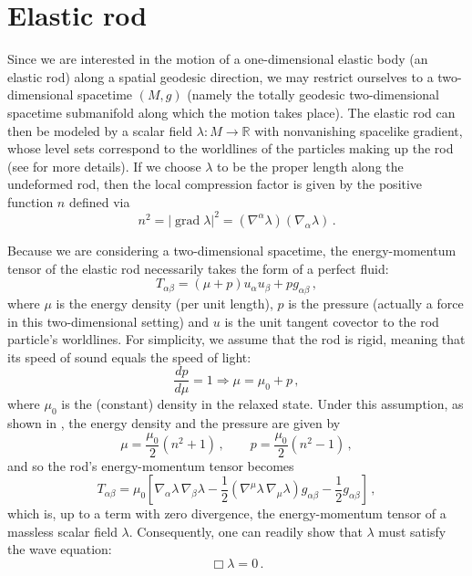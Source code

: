 \documentclass[10pt]{amsart}
\newcommand{\grad}{\operatorname{grad}}
\begin{document}
\section{Elastic rod}\label{section2}
%
Since we are interested in the motion of a one-dimensional elastic body (an elastic rod) along a spatial geodesic direction, we may restrict ourselves to a two-dimensional spacetime $(M,g)$ (namely the totally geodesic two-dimensional spacetime submanifold along which the motion takes place). The elastic rod can then be modeled by a scalar field $\lambda : M \to \mathbb{R}$ with nonvanishing spacelike gradient, whose level sets correspond to the worldlines of the particles making up the rod (see \cite{Natario14} for more details). If we choose $\lambda$ to be the proper length along the undeformed rod, then the local compression factor is given by the positive function $n$ defined via
%
\begin{equation}
n^2 = {|\grad \lambda|}^2 = ({\nabla}^{\alpha}\lambda)({\nabla}_{\alpha}\lambda) \, .
\end{equation}

Because we are considering a two-dimensional spacetime, the energy-momentum tensor of the elastic rod necessarily takes the form of a perfect fluid:
%
\begin{equation}
T_{\alpha\beta} = (\mu + p) u_\alpha u_\beta + p g_{\alpha\beta} \, ,
\end{equation}
%
where $\mu$ is the energy density (per unit length), $p$ is the pressure (actually a force in this two-dimensional setting) and $u$ is the unit tangent covector to the rod particle's worldlines.
%
For simplicity, we assume that the rod is rigid, meaning that its speed of sound equals the speed of light:
\begin{equation}
\frac{dp}{d\mu} = 1 \Rightarrow \mu = \mu_0 + p \, ,
\end{equation}
where $\mu_0$ is the (constant) density in the relaxed state. Under this assumption, as shown in \cite{Natario14}, the energy density and the pressure are given by
\begin{equation}
\mu = \frac{\mu_0}2 \left( n^2 + 1 \right) \, , \qquad p = \frac{\mu_0}2 \left( n^2 - 1 \right) \, ,
\end{equation}
and so the rod's energy-momentum tensor becomes
\begin{equation}\label{eq:energymomentumtensor}
T_{\alpha\beta} = \mu_0 \left[ {\nabla}_{\alpha} \lambda \, {\nabla}_{\beta}\lambda - \frac12 ({\nabla}^{\mu}\lambda\,{\nabla}_{\mu}\lambda) g_{\alpha\beta} - \frac12 g_{\alpha\beta} \right] \, ,
\end{equation}
which is, up to a term with zero divergence, the energy-momentum tensor of a massless scalar field $\lambda$. Consequently, one can readily show that $\lambda$ must satisfy the wave equation:
%
\begin{equation}
\Box \lambda = 0 \, .
\end{equation}
\end{document}
